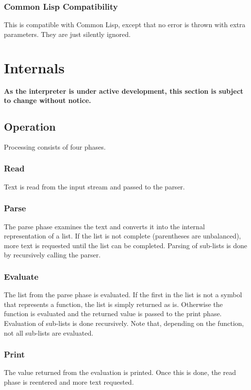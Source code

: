 \documentclass[10pt, openany]{book}
\newcommand{\cl}{Common Lisp}
\begin{document}
\subsection{Common Lisp Compatibility}
This is compatible with \cl, except that no error is thrown with extra parameters.  They are just silently ignored.
\chapter{Internals}
\textbf{As the interpreter is under active development, this section is subject to change without notice.}

\section{Operation}
Processing consists of four phases.

\subsection{Read}
Text is read from the input stream and passed to the parser.

\subsection{Parse}
The parse phase examines the text and converts it into the internal representation of a list.  If the list is not complete (parentheses are unbalanced), more text is requested until the list can be completed.  Parsing of sub-lists is done by recursively calling the parser.

\subsection{Evaluate}
The list from the parse phase is evaluated.  If the first in the list is not a symbol that represents a function, the list is simply returned as is.  Otherwise the function is evaluated and the returned value is passed to the print phase.  Evaluation of sub-lists is done recursively.  Note that, depending on the function, not all sub-lists are evaluated.

\subsection{Print}
The value returned from the evaluation is printed.  Once this is done, the read phase is reentered and more text requested.
\end{document}
